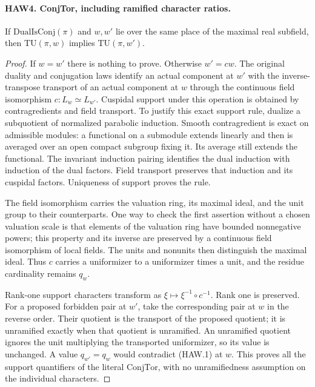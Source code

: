 \documentclass[11pt,a4paper]{article}
\numberwithin{equation}{section}
\theoremstyle{remark}\newtheorem{remark}[theorem]{Remark}
\begin{document}
\paragraph{HAW4. ConjTor, including ramified character ratios.}
\label{claim:HAW4}
If $\mathrm{DualIsConj}(\pi)$ and $w,w'$ lie over the same
place of the maximal real subfield, then
$\mathrm{TU}(\pi,w)$ implies $\mathrm{TU}(\pi,w')$.
\begin{proof}
If $w=w'$ there is nothing to prove.  Otherwise $w'=cw$.
The original duality and conjugation laws identify an actual
component at $w'$ with the inverse-transpose transport of an
actual component at $w$ through the continuous field
isomorphism $c:L_w\simeq L_{w'}$.  Cuspidal support under
this operation is obtained by contragredients and field
transport.  To justify this exact support rule, dualize a
subquotient of normalized parabolic induction.  Smooth
contragredient is exact on admissible modules: a functional
on a submodule extends linearly and then is averaged over
an open compact subgroup fixing it.  Its average still
extends the functional.  The invariant induction pairing
identifies the dual induction with induction of the dual
factors.  Field transport preserves that induction and its
cuspidal factors.  Uniqueness of support proves the rule.

The field isomorphism carries the valuation ring, its maximal
ideal, and the unit group to their counterparts.  One way to
check the first assertion without a chosen valuation scale is
that elements of the valuation ring have bounded nonnegative
powers; this property and its inverse are preserved by a
continuous field isomorphism of local fields.  The units and
nonunits then distinguish the maximal ideal.  Thus $c$ carries
a uniformizer to a uniformizer times a unit, and the residue
cardinality remains $q_w$.

Rank-one support characters transform as
$\xi\mapsto\xi^{-1}\circ c^{-1}$.  Rank one is preserved.
For a proposed forbidden pair at $w'$, take the corresponding
pair at $w$ in the reverse order.  Their quotient is the
transport of the proposed quotient; it is unramified exactly
when that quotient is unramified.  An unramified quotient
ignores the unit multiplying the transported uniformizer, so
its value is unchanged.  A value $q_{w'}=q_w$ would contradict
(HAW.1) at $w$.  This proves all the support quantifiers of
the literal $\mathrm{ConjTor}$, with no unramifiedness
assumption on the individual characters.
\end{proof}
\end{document}
